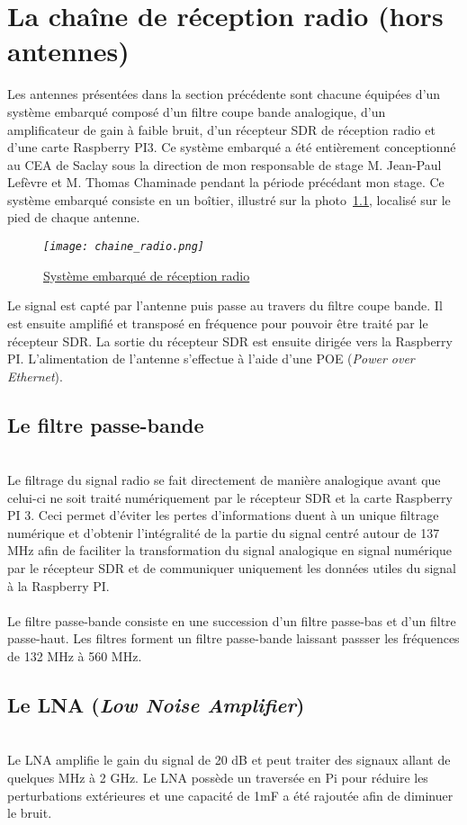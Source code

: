\documentclass[12pt,fleqn]{book} %
\begin{document}
\chapter{La chaîne de réception radio (hors antennes)}
Les antennes présentées dans la section précédente sont chacune équipées d'un système embarqué composé d'un filtre coupe bande analogique, d'un amplificateur de gain à faible bruit, d'un récepteur SDR de réception radio et d'une carte Raspberry PI3. Ce système embarqué a été entièrement conceptionné au CEA de Saclay sous la direction de mon responsable de stage M. Jean-Paul Lefèvre et M. Thomas Chaminade pendant la période précédant mon stage.
Ce système embarqué consiste en un boîtier, illustré sur la photo~\underline{\color{blue}\ref{boîtier}}, localisé sur le pied de chaque antenne.
\begin{figure}[H]
	\centering
	\itshape
	\texttt{[image: chaine\_radio.png]}
	\caption{\label{boîtier} \underline{Système embarqué de réception radio}}
\end{figure}
Le signal est capté par l'antenne puis passe au travers du filtre coupe bande. Il est ensuite amplifié et transposé en fréquence pour pouvoir être traité par le récepteur SDR. La sortie du récepteur SDR est ensuite dirigée vers la Raspberry PI. L'alimentation de l'antenne s'effectue à l'aide d'une POE (\emph{Power over Ethernet}).
\section{Le filtre passe-bande}
~\\\indent Le filtrage du signal radio se fait directement de manière analogique avant que celui-ci ne soit traité numériquement par le récepteur SDR et la carte Raspberry PI 3. Ceci permet d'éviter les pertes d'informations duent à un unique filtrage numérique et d'obtenir l'intégralité de la partie du signal centré autour de 137 MHz afin de faciliter la transformation du signal analogique en signal numérique par le récepteur SDR et de communiquer uniquement les données utiles du signal à la Raspberry PI.
~\\\\Le filtre passe-bande consiste en une succession d'un filtre passe-bas et d'un filtre passe-haut. Les filtres forment un filtre passe-bande laissant passser les fréquences de 132 MHz à 560 MHz.
\section{Le LNA (\emph{Low Noise Amplifier})}
~\\\indent Le LNA amplifie le gain du signal de 20 dB et peut traiter des signaux allant de quelques MHz à 2 GHz. Le LNA possède un traversée en Pi pour réduire les perturbations extérieures et une capacité de 1mF a été rajoutée afin de diminuer le bruit.
\end{document}
